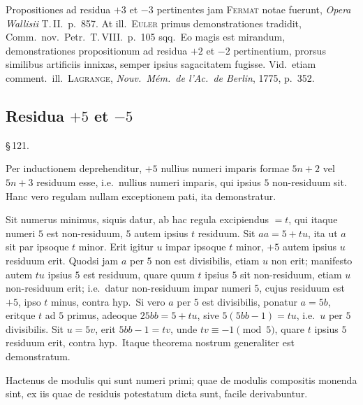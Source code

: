 \documentclass[12pt,a4paper]{article}
\theoremstyle{plain}
\theoremstyle{definition}
\theoremstyle{remark}
\begin{document}
Propositiones ad residua $+3$ et $-3$ pertinentes jam \textsc{Fermat} notae fuerunt, \emph{Opera Wallisii} T.\,II.\ p.~857. At ill.\ \textsc{Euler} primus demonstrationes tradidit, Comm.\ nov.\ Petr.\ T.\,VIII.\ p.~105 sqq.\ Eo magis est mirandum, demonstrationes propositionum ad residua $+2$ et $-2$ pertinentium, prorsus similibus artificiis innixas, semper ipsius sagacitatem fugisse. Vid.\ etiam comment.\ ill.\ \textsc{Lagrange}, \emph{Nouv.\ M\'em.\ de l'Ac.\ de Berlin}, 1775, p.~352.

\subsection*{Residua $+5$ et $-5$}

\begin{center}\S\,121.\end{center}

Per inductionem deprehenditur, $+5$ nullius numeri imparis formae $5n+2$ vel $5n+3$ residuum esse, i.e.\ nullius numeri imparis, qui ipsius $5$ non-residuum sit. Hanc vero regulam nullam exceptionem pati, ita demonstratur.

Sit numerus minimus, siquis datur, ab hac regula excipiendus $= t$, qui itaque numeri $5$ est non-residuum, $5$ autem ipsius $t$ residuum. Sit $aa = 5 + tu$, ita ut $a$ sit par ipsoque $t$ minor. Erit igitur $u$ impar ipsoque $t$ minor, $+5$ autem ipsius $u$ residuum erit. Quodsi jam $a$ per $5$ non est divisibilis, etiam $u$ non erit; manifesto autem $tu$ ipsius $5$ est residuum, quare quum $t$ ipsius $5$ sit non-residuum, etiam $u$ non-residuum erit; i.e.\ datur non-residuum impar numeri $5$, cujus residuum est $+5$, ipso $t$ minus, contra hyp.\ Si vero $a$ per $5$ est divisibilis, ponatur $a = 5b$, eritque $t$ ad $5$ primus, adeoque $25bb = 5 + tu$, sive $5(5bb - 1) = tu$, i.e.\ $u$ per $5$ divisibilis. Sit $u = 5v$, erit $5bb - 1 = tv$, unde $tv \equiv -1 \pmod{5}$, quare $t$ ipsius $5$ residuum erit, contra hyp.\ Itaque theorema nostrum generaliter est demonstratum.

\vspace{1em}

Hactenus de modulis qui sunt numeri primi; quae de modulis compositis monenda sint, ex iis quae de residuis potestatum dicta sunt, facile derivabuntur.
\end{document}
